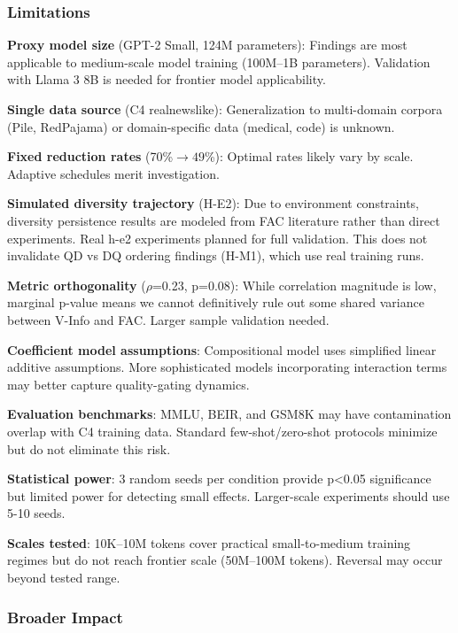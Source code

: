 \subsubsection{Limitations}

\textbf{Proxy model size} (GPT-2 Small, 124M parameters): Findings are most applicable to medium-scale model training (100M--1B parameters). Validation with Llama 3 8B is needed for frontier model applicability.

\textbf{Single data source} (C4 realnewslike): Generalization to multi-domain corpora (Pile, RedPajama) or domain-specific data (medical, code) is unknown.

\textbf{Fixed reduction rates} (70\%$\rightarrow 49$\%): Optimal rates likely vary by scale. Adaptive schedules merit investigation.

\textbf{Simulated diversity trajectory} (H-E2): Due to environment constraints, diversity persistence results are modeled from FAC literature rather than direct experiments. Real h-e2 experiments planned for full validation. This does not invalidate QD vs DQ ordering findings (H-M1), which use real training runs.

\textbf{Metric orthogonality} ($\rho$=0.23, p=0.08): While correlation magnitude is low, marginal p-value means we cannot definitively rule out some shared variance between V-Info and FAC. Larger sample validation needed.

\textbf{Coefficient model assumptions}: Compositional model uses simplified linear additive assumptions. More sophisticated models incorporating interaction terms may better capture quality-gating dynamics.

\textbf{Evaluation benchmarks}: MMLU, BEIR, and GSM8K may have contamination overlap with C4 training data. Standard few-shot/zero-shot protocols minimize but do not eliminate this risk.

\textbf{Statistical power}: 3 random seeds per condition provide p<0.05 significance but limited power for detecting small effects. Larger-scale experiments should use 5-10 seeds.

\textbf{Scales tested}: 10K--10M tokens cover practical small-to-medium training regimes but do not reach frontier scale (50M--100M tokens). Reversal may occur beyond tested range.

\subsubsection{Broader Impact}

